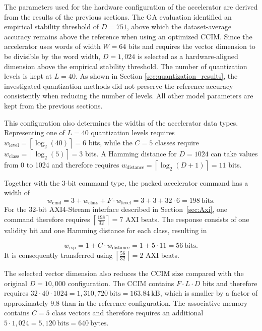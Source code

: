 The parameters used for the hardware configuration of the accelerator are derived from the results of the previous sections. The GA evaluation identified an empirical stability threshold of $D=751$, above which the dataset-average accuracy remains above the reference when using an optimized \ac{CCIM}. Since the accelerator uses words of width $W=64$ bits and requires the vector dimension to be divisible by the word width, $D=1{,}024$ is selected as a hardware-aligned dimension above the empirical stability threshold.
The number of quantization levels is kept at $L=40$. As shown in Section \ref{sec:quantization_results}, the investigated quantization methods did not preserve the reference accuracy consistently when reducing the number of levels. All other model parameters are kept from the previous sections.

This configuration also determines the widths of the accelerator data types. Representing one of $L=40$ quantization levels requires $w_{\mathrm{level}}=\left\lceil \log_2(40)\right\rceil=6$
bits, while the \(C=5\) classes require $w_{\mathrm{class}}=\left\lceil \log_2(5)\right\rceil=3$ bits. A Hamming distance for $D=1024$ can take values from 0 to 1024 and therefore requires $w_{\mathrm{distance}}=\left\lceil \log_2(D+1) \right\rceil=11$ bits.

Together with the 3-bit command type, the packed accelerator command has a width of
\[
    w_{\mathrm{cmd}}
    =
    3 + w_{\mathrm{class}} + F \cdot w_{\mathrm{level}}
    =
    3 + 3 + 32 \cdot 6
    =
    198~\mathrm{bits}.
\]
For the 32-bit AXI4-Stream interface described in Section~\ref{sec:Axi}, one command therefore requires $\left\lceil \frac{198}{32} \right\rceil=7$ AXI beats. The response consists of one validity bit and one Hamming distance for each class, resulting in

\[
    w_{\mathrm{rsp}}
    =
    1 + C \cdot w_{\mathrm{distance}}
    =
    1 + 5 \cdot 11
    =
    56~\mathrm{bits}.
\]
It is consequently transferred using $\left\lceil \frac{56}{32} \right\rceil=2$ AXI beats. 

The selected vector dimension also reduces the CCIM size compared with the original \(D=10{,}000\) configuration. The CCIM contains \(F \cdot L \cdot D\) bits and therefore requires $32 \cdot 40 \cdot 1024=1{,}310{,}720~\mathrm{bits}=163.84~\mathrm{kB}$, which is smaller by a factor of approximately $9.8$ than in the reference configuration.
The associative memory contains $C=5$ class vectors and therefore requires an additional $5 \cdot 1{,}024 = 5{,}120~\mathrm{bits} = 640~\mathrm{bytes}$.




